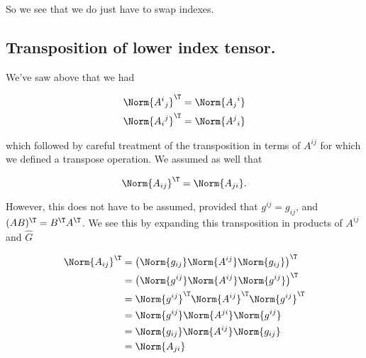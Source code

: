 So we see that we do just have to swap indexes.

%
%
%
%

\subsection{Transposition of lower index tensor.}

We've saw above that we had

\begin{align}\label{eqn:relativisticElectrodynamicsL11:1022}
\Norm{ {A^{i}}_j }^\T &= \Norm{ {A_{j}}^i } \\
\Norm{ {A_{i}}^j }^\T &= \Norm{ {A^{j}}_i } 
\end{align}

which followed by careful treatment of the transposition in terms of $A^{i j}$ for which we defined a transpose operation.  We assumed as well that

\begin{equation}\label{eqn:relativisticElectrodynamicsL11:1042}
\Norm{ A_{i j} }^\T = \Norm{ A_{j i} }.
\end{equation}

However, this does not have to be assumed, provided that $g^{i j} = g_{i j}$, and $(AB)^\T = B^\T A^\T$.  We see this by expanding this transposition in products of $A^{i j}$ and $\hat{G}$

\begin{align*}
\Norm{ A_{i j} }^\T
&= \left( \Norm{g_{i j}} \Norm{ A^{i j} } \Norm{g_{i j}} \right)^\T \\
&= \left( \Norm{g^{i j}} \Norm{ A^{i j} } \Norm{g^{i j}} \right)^\T \\
&= \Norm{g^{i j}}^\T \Norm{ A^{i j}}^\T \Norm{g^{i j}}^\T \\
&= \Norm{g^{i j}} \Norm{ A^{j i}} \Norm{g^{i j}} \\
&= \Norm{g_{i j}} \Norm{ A^{i j}} \Norm{g_{i j}} \\
&= \Norm{ A_{j i}} 
\end{align*}

